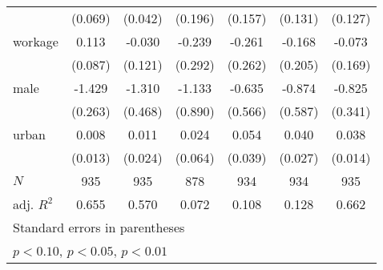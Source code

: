 {\begin{tabular}{l*{6}{c}}
            &     (0.069)         &     (0.042)         &     (0.196)         &     (0.157)         &     (0.131)         &     (0.127)         \\
[1em]
workage     &       0.113         &      -0.030         &      -0.239         &      -0.261         &      -0.168         &      -0.073         \\
            &     (0.087)         &     (0.121)         &     (0.292)         &     (0.262)         &     (0.205)         &     (0.169)         \\
[1em]
male        &      -1.429\sym{***}&      -1.310\sym{***}&      -1.133         &      -0.635         &      -0.874         &      -0.825\sym{**} \\
            &     (0.263)         &     (0.468)         &     (0.890)         &     (0.566)         &     (0.587)         &     (0.341)         \\
[1em]
urban       &       0.008         &       0.011         &       0.024         &       0.054         &       0.040         &       0.038\sym{**} \\
            &     (0.013)         &     (0.024)         &     (0.064)         &     (0.039)         &     (0.027)         &     (0.014)         \\
\hline
\(N\)       &         935         &         935         &         878         &         934         &         934         &         935         \\
adj. \(R^{2}\)&       0.655         &       0.570         &       0.072         &       0.108         &       0.128         &       0.662         \\
\hline\hline
\multicolumn{7}{l}{\footnotesize Standard errors in parentheses}\\
\multicolumn{7}{l}{\footnotesize \sym{*} \(p<0.10\), \sym{**} \(p<0.05\), \sym{***} \(p<0.01\)}\\
\end{tabular}
}
